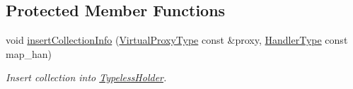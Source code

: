 \subsection*{Protected Member Functions}
\begin{DoxyCompactItemize}
\item 
void \hyperlink{structvt_1_1vrt_1_1collection_1_1_collection_manager_a0fec20114761687630f2a90fce374bc2}{insert\+Collection\+Info} (\hyperlink{namespacevt_a1b417dd5d684f045bb58a0ede70045ac}{Virtual\+Proxy\+Type} const \&proxy, \hyperlink{namespacevt_af64846b57dfcaf104da3ef6967917573}{Handler\+Type} const map\+\_\+han)
\begin{DoxyCompactList}\small\item\em Insert collection into {\ttfamily \hyperlink{structvt_1_1vrt_1_1collection_1_1_typeless_holder}{Typeless\+Holder}}. \end{DoxyCompactList}\end{DoxyCompactItemize}
